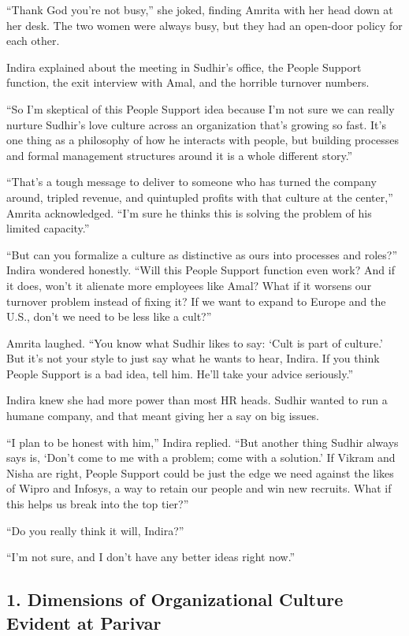 \documentclass[10pt,a4paper]{book}
\begin{document}
\begin{multicols}{3}
{“Thank God you’re not busy,” she joked, finding Amrita with her head down at her desk. The two women were always busy, but they had an open-door policy for each other.

Indira explained about the meeting in Sudhir’s office, the People Support function, the exit interview with Amal, and the horrible turnover numbers.

“So I’m skeptical of this People Support idea because I’m not sure we can really nurture Sudhir’s love culture across an organization that’s growing so fast. It’s one thing as a philosophy of how he interacts with people, but building processes and formal management structures around it is a whole different story.”

“That’s a tough message to deliver to someone who has turned the company around, tripled revenue, and quintupled profits with that culture at the center,” Amrita acknowledged. “I’m sure he thinks this is solving the problem of his limited capacity.”

“But can you formalize a culture as distinctive as ours into processes and roles?” Indira wondered honestly. “Will this People Support function even work? And if it does, won’t it alienate more employees like Amal? What if it worsens our turnover problem instead of fixing it? If we want to expand to Europe and the U.S., don’t we need to be less like a cult?”

Amrita laughed. “You know what Sudhir likes to say: ‘Cult is part of culture.’ But it’s not your style to just say what he wants to hear, Indira. If you think People Support is a bad idea, tell him. He’ll take your advice seriously.”

Indira knew she had more power than most HR heads. Sudhir wanted to run a humane company, and that meant giving her a say on big issues.

“I plan to be honest with him,” Indira replied. “But another thing Sudhir always says is, ‘Don’t come to me with a problem; come with a solution.’ If Vikram and Nisha are right, People Support could be just the edge we need against the likes of Wipro and Infosys, a way to retain our people and win new recruits. What if this helps us break into the top tier?”

“Do you really think it will, Indira?”

“I’m not sure, and I don’t have any better ideas right now.”
}
\end{multicols} 
\vspace{1cm}

\subsection*{1. Dimensions of Organizational Culture Evident at Parivar}
\end{document}
